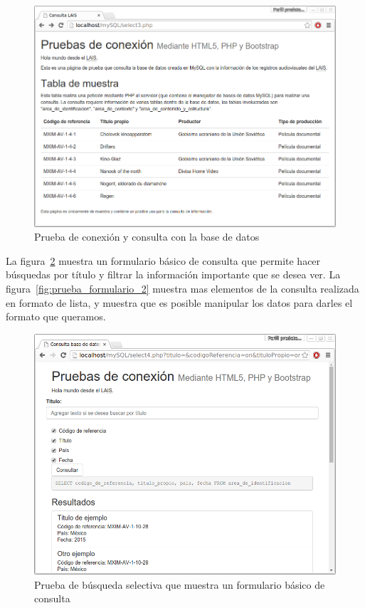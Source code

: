 \documentclass[10pt,letterpaper]{article}
\begin{document}
\begin{figure}[H]
	\centering
	\includegraphics[keepaspectratio=true,width=\linewidth]{Prototipo_01.png}
	\caption{Prueba de conexión y consulta con la base de datos}
	\label{fig:prueba_conexion}
\end{figure}

La figura~\ref{fig:prueba_formulario} muestra un formulario básico de consulta que permite hacer búsquedas por título y filtrar la información importante que se desea ver. La figura~\ref{fig:prueba_formulario_2} muestra mas elementos de la consulta realizada en formato de lista, y muestra que es posible manipular los datos para darles el formato que queramos.

\begin{figure}[H]
	\centering
	\includegraphics[keepaspectratio=true,width=\linewidth]{Prototipo_02.png}
	\caption{Prueba de búsqueda selectiva que muestra un formulario básico de consulta}
	\label{fig:prueba_formulario}
\end{figure}
\end{document}
